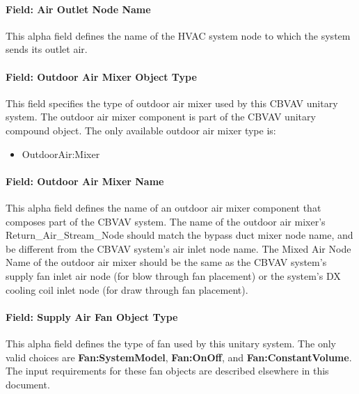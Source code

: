 \paragraph{Field: Air Outlet Node Name}\label{field-air-outlet-node-name-3-002}

This alpha field defines the name of the HVAC system node to which the system sends its outlet air.

\paragraph{Field: Outdoor Air Mixer Object Type}\label{field-outdoor-air-mixer-object-type}

This field specifies the type of outdoor air mixer used by this CBVAV unitary system. The outdoor air mixer component is part of the CBVAV unitary compound object. The only available outdoor air mixer type is:

\begin{itemize}
\tightlist
\item
  OutdoorAir:Mixer
\end{itemize}

\paragraph{Field: Outdoor Air Mixer Name}\label{field-outdoor-air-mixer-name}

This alpha field defines the name of an outdoor air mixer component that composes part of the CBVAV system. The name of the outdoor air mixer's Return\_Air\_Stream\_Node should match the bypass duct mixer node name, and be different from the CBVAV system's air inlet node name. The Mixed Air Node Name of the outdoor air mixer should be the same as the CBVAV system's supply fan inlet air node (for blow through fan placement) or the system's DX cooling coil inlet node (for draw through fan placement).

\paragraph{Field: Supply Air Fan Object Type}\label{field-supply-air-fan-object-type-3}

This alpha field defines the type of fan used by this unitary system. The only valid choices are \textbf{Fan:SystemModel}, \textbf{Fan:OnOff}, and \textbf{Fan:ConstantVolume}. The input requirements for these fan objects are described elsewhere in this document.

